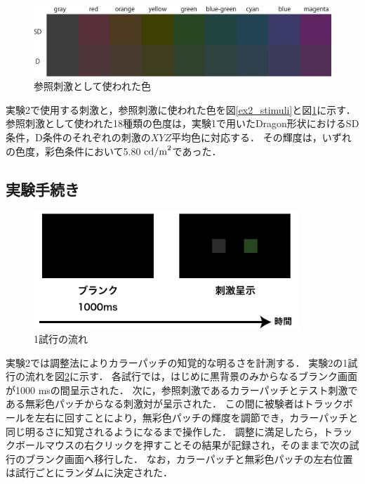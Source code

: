             \begin{figure}[h]
                \centering
                \includegraphics[width=14.0cm]{./img/ex2_stimuli_p.png}
                \caption{参照刺激として使われた色}
                \label{ex2_stimuli_set}
            \end{figure}
            \newpage

            実験2で使用する刺激と，参照刺激に使われた色を図\ref{ex2_stimuli}と図\ref{ex2_stimuli_set}に示す．
            参照刺激として使われた18種類の色度は，実験1で用いたDragon形状におけるSD条件，D条件のそれぞれの刺激の$XYZ$平均色に対応する．
            その輝度は，いずれの色度，彩色条件において5.80 ${\rm cd/m}^2$であった．

        \subsection{実験手続き}

            \begin{figure}[h]
                \centering
                \includegraphics[width=10.0cm]{./img/ex2_procedure.png}
                \caption{1試行の流れ}
                \label{ex2_procedure}
            \end{figure}

            実験2では調整法によりカラーパッチの知覚的な明るさを計測する．
            実験2の1試行の流れを図\ref{ex2_procedure}に示す．
            各試行では，はじめに黒背景のみからなるブランク画面が1000 msの間呈示された．
            次に，参照刺激であるカラーパッチとテスト刺激である無彩色パッチからなる刺激対が呈示された．
            この間に被験者はトラックボールを左右に回すことにより，無彩色パッチの輝度を調節でき，カラーパッチと同じ明るさに知覚されるようになるまで操作した．
            調整に満足したら，トラックボールマウスの右クリックを押すことその結果が記録され，そのままで次の試行のブランク画面へ移行した．
            なお，カラーパッチと無彩色パッチの左右位置は試行ごとにランダムに決定された．

